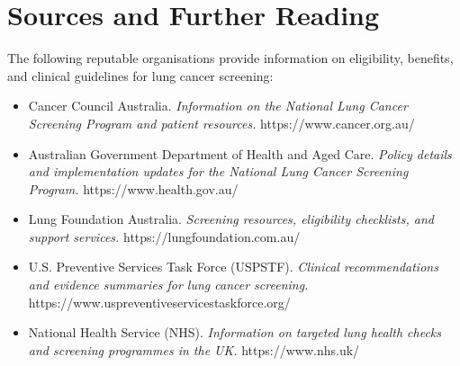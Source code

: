 \section*{Sources and Further Reading}
The following reputable organisations provide information on eligibility, benefits, and clinical guidelines for lung cancer screening:
\begin{itemize}
    \item Cancer Council Australia. \textit{Information on the National Lung Cancer Screening Program and patient resources.} https://www.cancer.org.au/
    \item Australian Government Department of Health and Aged Care. \textit{Policy details and implementation updates for the National Lung Cancer Screening Program.} https://www.health.gov.au/
    \item Lung Foundation Australia. \textit{Screening resources, eligibility checklists, and support services.} https://lungfoundation.com.au/
    \item U.S. Preventive Services Task Force (USPSTF). \textit{Clinical recommendations and evidence summaries for lung cancer screening.} https://www.uspreventiveservicestaskforce.org/
    \item National Health Service (NHS). \textit{Information on targeted lung health checks and screening programmes in the UK.} https://www.nhs.uk/
\end{itemize}
